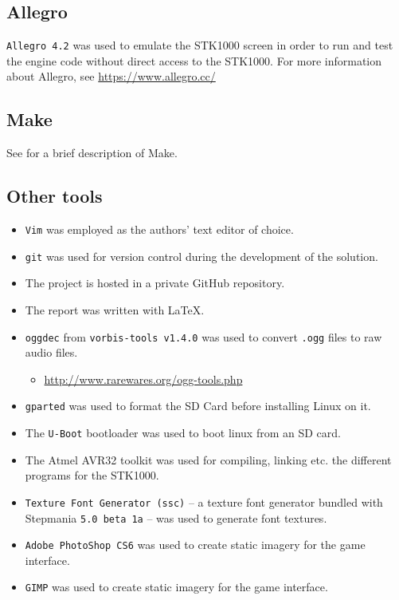 \subsection{Allegro}
	\texttt{Allegro 4.2} was used to emulate the STK1000 screen in order to run and test the engine code without direct access to the STK1000.
	For more information about Allegro, see \url{https://www.allegro.cc/}

\subsection{Make}
	See \cite{tdt4258-1} for a brief description of Make.

\subsection{Other tools}
	\begin{itemize}
		\item{\texttt{Vim} was employed as the authors' text editor of choice.}
		\item{\texttt{git} was used for version control during the development of the solution.}
		\item{The project is hosted in a private GitHub repository.}
		\item{The report was written with \LaTeX.}
		\item{\texttt{oggdec} from \texttt{vorbis-tools v1.4.0} was used to convert \texttt{.ogg} files to raw audio files.}
		\begin{itemize}
				\item{\url{http://www.rarewares.org/ogg-tools.php}}
		\end{itemize}
		\item{\texttt{gparted} was used to format the SD Card before installing Linux on it.}
		\item{The \texttt{U-Boot} bootloader was used to boot linux from an SD card.}
		\item{The Atmel AVR32 toolkit was used for compiling, linking etc. the different programs for the STK1000.}
		\item{\texttt{Texture Font Generator (ssc)} -- a texture font generator bundled with Stepmania \texttt{5.0 beta 1a} -- was used to generate font textures.}
		\item{\texttt{Adobe PhotoShop CS6} was used to create static imagery for the game interface.}
		\item{\texttt{GIMP} was used to create static imagery for the game interface.}
	\end{itemize}

